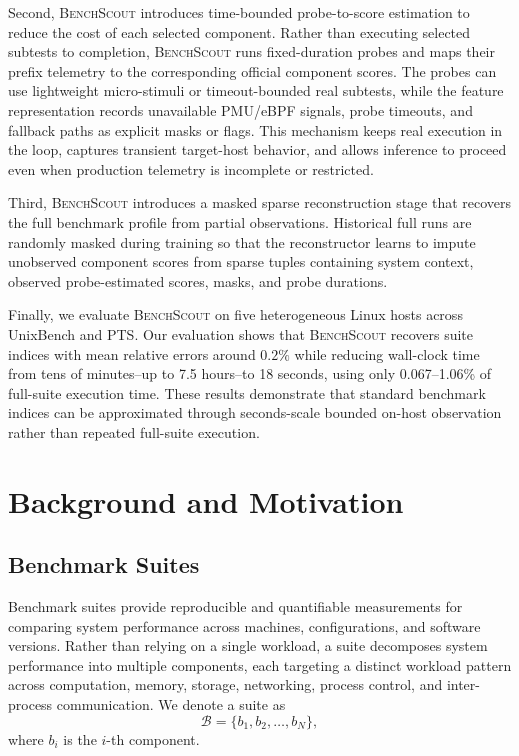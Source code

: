 \documentclass[sigplan,10pt]{acmart}
\newcommand{\ourmethod}{\textsc{BenchScout}\xspace}
\begin{document}
Second, \ourmethod{} introduces time-bounded probe-to-score estimation to reduce the cost of each selected component.
Rather than executing selected subtests to completion, \ourmethod{} runs fixed-duration probes and maps their prefix telemetry to the corresponding official component scores.
The probes can use lightweight micro-stimuli or timeout-bounded real subtests, while the feature representation records unavailable PMU/eBPF signals, probe timeouts, and fallback paths as explicit masks or flags.
This mechanism keeps real execution in the loop, captures transient target-host behavior, and allows inference to proceed even when production telemetry is incomplete or restricted.

Third, \ourmethod{} introduces a masked sparse reconstruction stage that recovers the full benchmark profile from partial observations.
Historical full runs are randomly masked during training so that the reconstructor learns to impute unobserved component scores from sparse tuples containing system context, observed probe-estimated scores, masks, and probe durations.

Finally, we evaluate \ourmethod{} on five heterogeneous Linux hosts across UnixBench and PTS.
Our evaluation shows that \ourmethod{} recovers suite indices with mean relative errors around \(0.2\%\) while reducing wall-clock time from tens of minutes--up to 7.5 hours--to 18 seconds, using only 0.067--1.06\% of full-suite execution time.
These results demonstrate that standard benchmark indices can be approximated through seconds-scale bounded on-host observation rather than repeated full-suite execution.



\section{Background and Motivation}

\subsection{Benchmark Suites}

Benchmark suites provide reproducible and quantifiable measurements for comparing system performance across machines, configurations, and software versions. Rather than relying on a single workload, a suite decomposes system performance into multiple components, each targeting a distinct workload pattern across computation, memory, storage, networking, process control, and inter-process communication. We denote a suite as
\begin{equation}
\label{eq:suite}
\mathcal{B}=\{b_1,b_2,\ldots,b_N\},
\end{equation}
where \(b_i\) is the \(i\)-th component.
\end{document}

